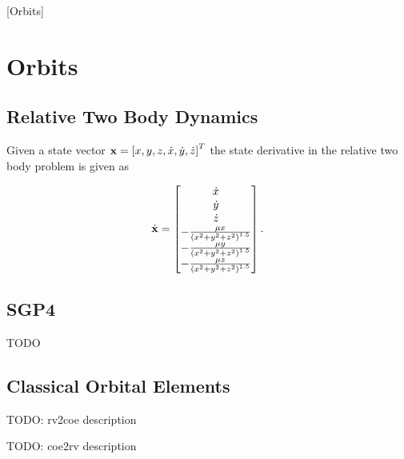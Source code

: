 [Orbits]

\chapter{Orbits}

\section{Relative Two Body Dynamics}

Given a state vector $\mathbf{x} = \left[ x, y, z, \dot{x}, \dot{y}, \dot{z} \right]^T$ the state derivative in the relative two body problem is given as

\begin{equation} \label{eq:two_body_dynamics}
    \dot{\mathbf{x}}
    =
    \left[\begin{matrix}
        \dot{x}\\
        \dot{y}\\
        \dot{z}\\
        -\frac{\mu x}{\left(x^2+y^2+z^2\right)^{1.5}}
        \\-\frac{\mu y}{\left(x^2+y^2+z^2\right)^{1.5}}
        \\-\frac{\mu z}{\left(x^2+y^2+z^2\right)^{1.5}}
        \\\end{matrix}\right].
\end{equation}

\section{SGP4}

TODO

\section{Classical Orbital Elements}

TODO: rv2coe description

TODO: coe2rv description